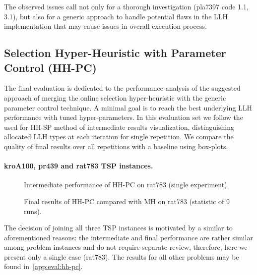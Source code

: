 The observed issues call not only for a thorough investigation (pla7397 code 1.1, 3.1), but also for a generic approach to handle potential flaws in the LLH implementation that may cause issues in overall execution process.


\subsection{Selection Hyper-Heuristic with Parameter Control (HH-PC)}\label{eval:1:hh-pc}
The final evaluation is dedicated to the performance analysis of the suggested approach of merging the online selection hyper-heuristic with the generic parameter control technique. A minimal goal is to reach the best underlying LLH performance with tuned hyper-parameters. In this evaluation set we follow the used for HH-SP method of intermediate results visualization, distinguishing allocated LLH types at each iteration for single repetition. We compare the quality of final results over all repetitions with a baseline using box-plots.

\paragraph{kroA100, pr439 and rat783 TSP instances.}
\begin{figure}[b]
	\centering
	\vspace{-20pt}
	
	\caption{Intermediate performance of HH-PC on rat783 (single experiment).}
	\vspace{-5pt}
	\label{eval:pict:hh-pc:rat783 intermediate}
\end{figure}

\begin{figure}[t]
	\centering
	\vspace{-20pt}
	
	\caption{Final results of HH-PC compared with MH on rat783 (statistic of 9 runs).}
	\vspace{-5pt}
	\label{eval:pict:hh-pc:rat783 final}
\end{figure}

The decision of joining all three TSP instances is motivated by a similar to aforementioned reasons: the intermediate and final performance are rather similar among problem instances and do not require separate review, therefore, here we present only a single case (rat783). The results for all other problems may be found in~\cref{app:eval:hh-pc}.

